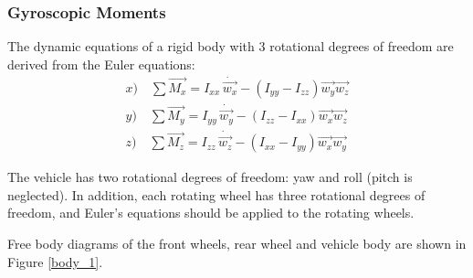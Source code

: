 \subsubsection{\textbf{Gyroscopic Moments}}

The dynamic equations of a rigid body with 3 rotational degrees of freedom are derived from the Euler equations:
\begin{eqnarray}
x) \quad \sum \vec{M_{x}}=I_{xx}\,\dot{\vec{w_{x}}} - (I_{yy}-I_{zz})\vec{w_{y}}\vec{w_{z}}\\
y) \quad \sum \vec{M_{y}}=I_{yy}\,\dot{\vec{w_{y}}} - (I_{zz}-I_{xx})\vec{w_{x}}\vec{w_{z}}\\
z) \quad \sum \vec{M_{z}}=I_{zz}\,\dot{\vec{w_{z}}} - (I_{xx}-I_{yy})\vec{w_{x}}\vec{w_{y}}
\end{eqnarray}

\newpage
The vehicle has two rotational degrees of freedom: yaw and roll (pitch is neglected). In addition, each rotating wheel has three rotational degrees of freedom, and Euler's equations should be applied to the rotating wheels.

Free body diagrams of the front wheels, rear wheel and vehicle body are shown in Figure \ref{body_1}. 

